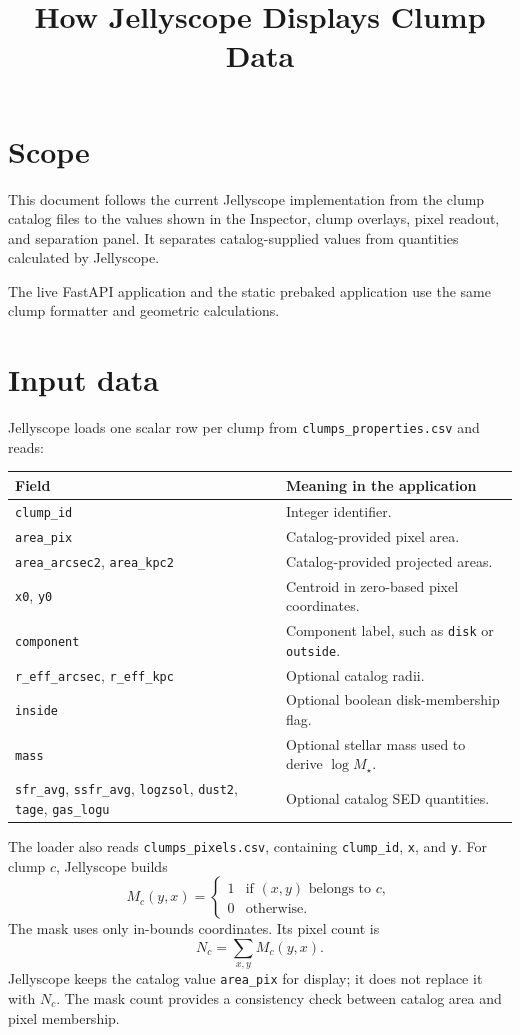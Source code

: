 \documentclass[11pt]{article}
\title{How Jellyscope Displays Clump Data}
\author{}
\date{}
\newcommand{\code}[1]{\texttt{#1}}
\begin{document}
\maketitle
\section{Scope}
This document follows the current Jellyscope implementation from the clump catalog files to the values shown in the Inspector, clump overlays, pixel readout, and separation panel. It separates catalog-supplied values from quantities calculated by Jellyscope.

The live FastAPI application and the static prebaked application use the same clump formatter and geometric calculations.
\section{Input data}
Jellyscope loads one scalar row per clump from \code{clumps\_properties.csv} and reads:
\begin{center}
\small
\begin{tabular}{p{} p{}}
\toprule
Field & Meaning in the application \\
\midrule
\code{clump\_id} & Integer identifier. \\
\code{area\_pix} & Catalog-provided pixel area. \\
\code{area\_arcsec2}, \code{area\_kpc2} & Catalog-provided projected areas. \\
\code{x0}, \code{y0} & Centroid in zero-based pixel coordinates. \\
\code{component} & Component label, such as \code{disk} or \code{outside}. \\
\code{r\_eff\_arcsec}, \code{r\_eff\_kpc} & Optional catalog radii. \\
\code{inside} & Optional boolean disk-membership flag. \\
\code{mass} & Optional stellar mass used to derive $\log M_\star$. \\
\code{sfr\_avg}, \code{ssfr\_avg}, \code{logzsol}, \code{dust2}, \code{tage}, \code{gas\_logu} & Optional catalog SED quantities. \\
\bottomrule
\end{tabular}
\normalsize
\end{center}

The loader also reads \code{clumps\_pixels.csv}, containing \code{clump\_id}, \code{x}, and \code{y}. For clump $c$, Jellyscope builds
\begin{equation}
 M_c(y,x) = \begin{cases}
 1 & \text{if } (x,y) \text{ belongs to } c, \\
 0 & \text{otherwise.}
 \end{cases}
\end{equation}
The mask uses only in-bounds coordinates. Its pixel count is
\begin{equation}
 N_c = \sum_{x,y} M_c(y,x).
\end{equation}
Jellyscope keeps the catalog value \code{area\_pix} for display; it does not replace it with $N_c$. The mask count provides a consistency check between catalog area and pixel membership.
\end{document}
